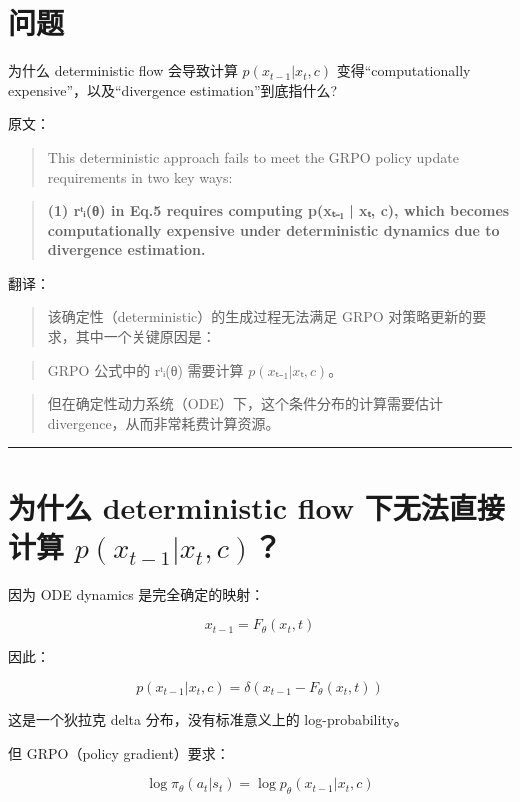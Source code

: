 \section{问题}

为什么 deterministic flow 会导致计算 \(p(x_{t−1} | x_t, c)\) 变得“computationally expensive”，以及“divergence estimation”到底指什么?

原文：

\begin{quote}
This deterministic approach fails to meet the GRPO policy update requirements in two key ways:
\end{quote}

\begin{quote}
\textbf{(1) rᵗᵢ(θ) in Eq.5 requires computing p(xₜ₋₁ | xₜ, c), which becomes computationally expensive under deterministic dynamics due to divergence estimation.}
\end{quote}

翻译：

\begin{quote}
该确定性（deterministic）的生成过程无法满足 GRPO 对策略更新的要求，其中一个关键原因是：
\end{quote}

\begin{quote}
GRPO 公式中的 rᵗᵢ(θ) 需要计算 \(p(xₜ₋₁ | xₜ, c)\)。
\end{quote}

\begin{quote}
但在确定性动力系统（ODE）下，这个条件分布的计算需要估计 divergence，从而非常耗费计算资源。
\end{quote}

\hrule

\section{为什么 deterministic flow 下无法直接计算 \(p(x_{t-1} | x_t, c)\)？}

因为 ODE dynamics 是完全确定的映射：

\[
x_{t-1} = F_\theta(x_t, t)
\]

因此：

\[
p(x_{t-1}|x_t,c) = \delta(x_{t-1} - F_\theta(x_t,t))
\]

这是一个狄拉克 delta 分布，没有标准意义上的 log-probability。

但 GRPO（policy gradient）要求：

\[
\log \pi_\theta(a_t | s_t) = \log p_\theta(x_{t-1}|x_t,c)
\]

